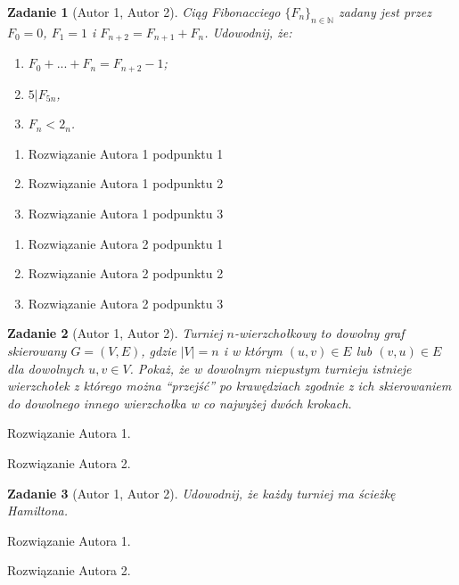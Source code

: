 \documentclass{mwart}
\newtheorem{zad}{Zadanie}[section]
\begin{document}
\begin{zad}[Autor 1, Autor 2]
    Ciąg Fibonacciego $\{F_n\}_{n \in \mathbb{N}}$ zadany jest przez
    $F_0=0$, $F_1=1$ i $F_{n+2}=F_{n+1}+F_n$. Udowodnij, że: \\
    \begin{enumerate}
        \item $F_0 + ... + F_n = F_{n+2} - 1$;
        \item $5|F_{5n}$,
        \item $F_n < 2_n$.
    \end{enumerate}
\end{zad}
\begin{mdframed}
    \begin{enumerate}
        \item Rozwiązanie Autora 1 podpunktu 1
        \item Rozwiązanie Autora 1 podpunktu 2
        \item Rozwiązanie Autora 1 podpunktu 3
    \end{enumerate}
\end{mdframed}
\begin{mdframed}
    \begin{enumerate}
        \item Rozwiązanie Autora 2 podpunktu 1
        \item Rozwiązanie Autora 2 podpunktu 2
        \item Rozwiązanie Autora 2 podpunktu 3
    \end{enumerate}
\end{mdframed}




\begin{zad}[Autor 1, Autor 2]
    Turniej $n$-wierzchołkowy to dowolny graf skierowany $G = (V, E)$, gdzie $|V| = n$
    i w którym $(u, v) \in E$ lub $(v, u) \in E$ dla dowolnych $u, v \in V$.
    Pokaż, że w dowolnym niepustym turnieju istnieje wierzchołek z którego można “przejść”
    po krawędziach zgodnie z ich skierowaniem do dowolnego innego wierzchołka w co
    najwyżej dwóch krokach.
\end{zad}
\begin{mdframed}
    Rozwiązanie Autora 1.
\end{mdframed}
\begin{mdframed}
    Rozwiązanie Autora 2.
\end{mdframed}

\begin{zad}[Autor 1, Autor 2]
    Udowodnij, że każdy turniej ma ścieżkę Hamiltona.
\end{zad}
\begin{mdframed}
    Rozwiązanie Autora 1.
\end{mdframed}
\begin{mdframed}
    Rozwiązanie Autora 2.
\end{mdframed}
\end{document}
